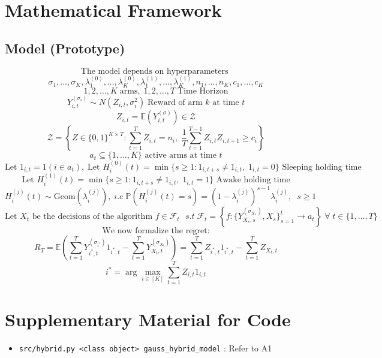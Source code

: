 \documentclass{article}
\begin{document}
\section{Mathematical Framework}

\subsection{Model (Prototype)}
$$\text{The model depends on hyperparameters }$$
$$\sigma_1, \ldots ,\sigma_K, \lambda_1^{(0)}, \ldots, \lambda_K^{(0)}, \lambda_1^{(1)}, \ldots, \lambda_K^{(1)}, n_1, \ldots, n_K, c_1, \ldots, c_K$$
$$1, 2, \ldots, K\; \text{arms}, \; 1, 2, \ldots, T\; \text{Time Horizon}$$
$$Y^{(\sigma_i)}_{i, t} \sim N(Z_{i, t}, \sigma_i^2)\; \text{Reward of arm $k$ at time $t$}$$
$$Z_{i, t} = \mathbb{E}(Y_{i, t}^{(\sigma)}) \in \mathcal{Z}$$
$$\mathcal{Z} = \left\{ Z \in \{0, 1\}^{K \times T} : \sum_{t=1}^T Z_{i, t} = n_i, \; \frac{1}{T}\sum_{t=1}^{T-1}Z_{i, t} Z_{i, t+1} \geq c_i \right\}$$
$$a_t \subseteq \{1, \ldots, K\} \text{ active arms at time }t$$
$$\text{Let }1_{i, t} = 1(i \in a_t), \; \text{Let }H_i^{(0)}(t) = \min\{s \geq 1: 1_{i, t+s} \neq 1_{i,t}, \; 1_{i,t} = 0\} \text{ Sleeping holding time}$$
$$\text{Let }H_i^{(1)}(t) = \min\{s \geq 1: 1_{i, t+s} \neq 1_{i, t}, \; 1_{i,t} = 1\} \text{ Awake holding time}$$
$$H_i^{(j)}(t) \sim \text{Geom}(\lambda_i^{(j)}), \;i.e\; \mathbb{P}(H_i^{(j)}(t) = s) = (1-\lambda^{(j)}_i)^{s-1}\lambda^{(j)}_i, \;\; s \geq 1$$
$$\text{Let }X_t \text{ be the decisions of the algorithm $f \in \mathcal{F}_t$ } s.t \; \mathcal{F}_t = \left\{f : \{Y_{X_s, s}^{(\sigma_{X_s})}, X_{s}\}_{s=1}^t \rightarrow a_t \right\} \; \forall \; t\in\{1, \ldots, T\}$$
$$\text{We now formalize the regret:}$$
$$R_T = \mathbb{E}\left(\sum_{t=1}^T Y^{(\sigma_{i^*})}_{i^*, t} 1_{i^*, t} - \sum_{t=1}^T Y_{X_t, t}^{(\sigma_{X_t})}\right) = \sum_{t=1}^T Z_{i^*, t} 1_{i^*, t} - \sum_{t=1}^T Z_{X_t, t}$$
$$i^* = \arg\max_{i \in [K]} \sum_{t=1}^T Z_{i, t}1_{i, t}$$



\section{Supplementary Material for Code}

\begin{itemize}
    \item \texttt{src/hybrid.py <class object> gauss\_hybrid\_model} : Refer to A1
\end{itemize}
\end{document}
